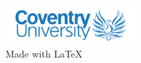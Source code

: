 \newpage
\restoregeometry		%
\maketitle				%
\thispagestyle{empty}	%
\vfill					%
\begin{center}
	\includegraphics[width=5cm]{img/coventry-uni.png}\\
	
	Made with \LaTeX
\end{center}